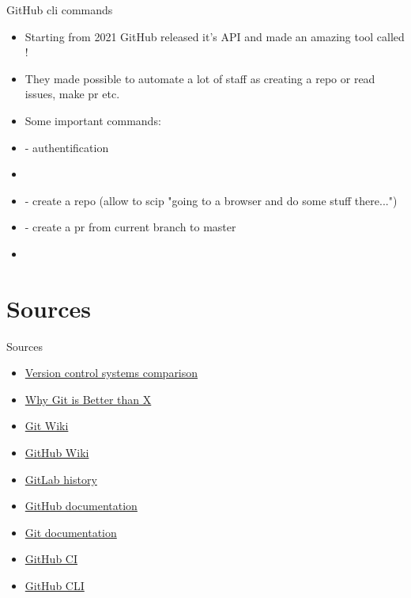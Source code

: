 \documentclass[usenames,dvipsnames,10pt,aspectratio=169]{beamer}
\begin{document}
\begin{frame}{GitHub cli commands}
    \begin{itemize}
        \item Starting from 2021 GitHub released it's API and made an amazing tool called !
        \item They made possible to automate a lot of staff as creating a repo or read issues, make pr etc.
        \item Some important commands:
        \item {} - authentification
        \item {}
        \item {} - create a repo (allow to scip "going to a browser and do some stuff there...")
        \item {} - create a pr from current branch to master
        \item {}
    \end{itemize}
\end{frame}


\section{Sources}
\begin{frame}{Sources}
    \begin{itemize}
       \item \href{https://en.wikipedia.org/wiki/Comparison_of_version-control_software}{Version control systems comparison}
       \item \href{https://translatedby.com/you/why-git-is-better-than-x/original/}{Why Git is Better than X}
       \item \href{https://en.wikipedia.org/wiki/Git}{Git Wiki}
       \item \href{https://en.wikipedia.org/wiki/GitHub}{GitHub Wiki}
       \item \href{https://about.gitlab.com/company/history/}{GitLab history}
       \item \href{https://docs.github.com/en}{GitHub documentation}
       \item \href{https://git-scm.com/}{Git documentation}
       \item \href{https://docs.github.com/en/actions/guides/about-continuous-integration}{GitHub CI}
       \item \href{https://cli.github.com/}{GitHub CLI}
    \end{itemize}
\end{frame}
\end{document}
